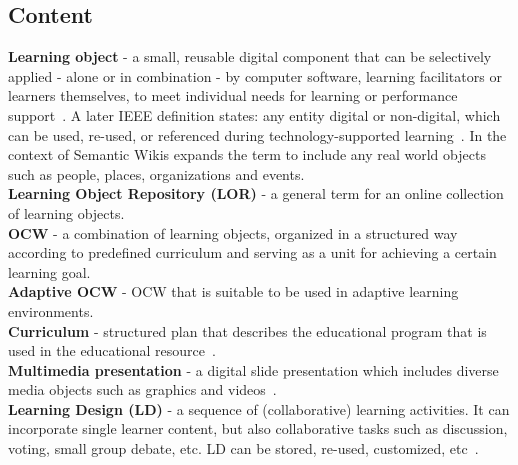 \documentclass[ngerman,UKenglish,table]{scrbook}
\begin{document}
\subsection{Content}
\textbf{Learning object} - a small, reusable digital component that can be selectively applied - alone or in combination - by computer software, learning facilitators or learners themselves, to meet individual needs for learning or performance support~\cite{shepherd2000objects}.
A later IEEE definition states: any entity digital or non-digital, which can be used, re-used, or referenced during technology-supported learning~\cite{learn_definition2002}.
In the context of Semantic Wikis \citeauthor{Li2010a} expands the term to include any real world objects such as people, places, organizations and events.\\
\textbf{Learning Object Repository (LOR)} - a general term for an online collection of learning objects.\\
\textbf{OCW} - a combination of learning objects, organized in a structured way according to predefined curriculum and serving as a unit for achieving a certain learning goal.\\
\textbf{Adaptive OCW} - OCW that is suitable to be used in adaptive learning environments.\\
\textbf{Curriculum} - structured plan that describes the educational program that is used in the educational resource~\cite{Marcilla2012}.\\
\textbf{Multimedia presentation} - a digital slide presentation which includes diverse media objects such as graphics and videos~\cite{Hong2012}.\\
\textbf{Learning Design (LD)} - a sequence of (collaborative) learning activities. It can incorporate single learner content, but also collaborative tasks such as discussion, voting, small group debate, etc. LD can be stored, re-used, customized, etc~\cite{Romero-Moreno2007}.\\
\end{document}
